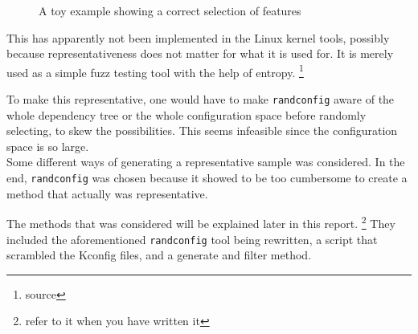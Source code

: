 \documentclass[a4paper,11pt]{report}
\newcommand{\textcode}[1]{
    \fboxsep=1pt
    \texttt{\colorbox{gray!20}{#1}}
}
\newcommand{\figa}{
    \begin{figure}[!htpb]
    \centering
}
\newcommand{\figb}[2]{
    \caption{#1}
    \label{#2}
    \end{figure}
}
\begin{document}
\figa
\figb{A toy example showing a correct selection of features}{randconfigtoy33}

This has apparently not been implemented in the Linux kernel tools, possibly 
because representativeness does not matter for what it is used for. It is 
merely used as a simple fuzz testing tool with the help of entropy.
    \footnote{source}

To make this representative, one would have to make \texttt{randconfig} aware of
the whole dependency tree or the whole configuration space before randomly 
selecting, to skew the possibilities. This seems infeasible since the 
configuration space is so large.
\\

Some different ways of generating a representative sample was considered. In 
the end, \texttt{randconfig} was chosen because it showed to be too cumbersome 
to create a method that actually was representative. 

The methods that was considered will be explained later in this report. 
    \footnote{refer to it when you have written it} 
They included the aforementioned \texttt{randconfig} tool being rewritten, a 
script that scrambled the Kconfig files, and a generate and filter method.
\\
\end{document}
